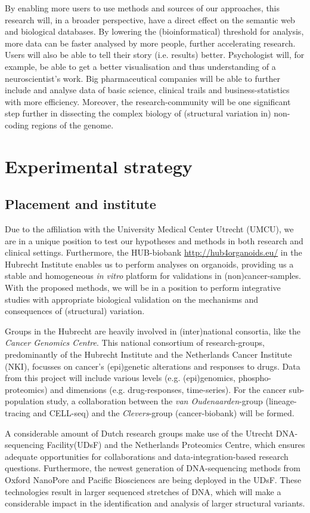 \documentclass[twoside,fontsize=12pt]{article}
\begin{document}
By enabling more users to use methods and sources of our approaches, this research will, in a broader perspective, have a direct effect on the semantic web and biological databases. By lowering the (bioinformatical) threshold for analysis, more data can be faster analysed by more people, further accelerating research. Users will also be able to tell their story (i.e. results) better. Psychologist will, for example, be able to get a better visualisation and thus understanding of a neuroscientist's work. Big pharmaceutical companies will be able to further include and analyse data of basic science, clinical trails and business-statistics with more efficiency. Moreover, the research-community will be one significant step further in dissecting the complex biology of (structural variation in) non-coding regions of the genome.

\section*{Experimental strategy}
\subsection*{Placement and institute}
Due to the affiliation with the University Medical Center Utrecht (UMCU), we are in a unique position to test our hypotheses and methods in both research and clinical settings. Furthermore, the HUB-biobank \url{http://hub4organoids.eu/} in the Hubrecht Institute  enables us to perform analyses on organoids, providing us a stable and homogeneous \textit{in vitro} platform for validations in (non)cancer-samples. With the proposed methods, we will be in a position to perform integrative studies with appropriate biological validation on the mechanisms and consequences of (structural) variation. 

Groups in the Hubrecht are heavily involved in (inter)national consortia, like the \textit{Cancer Genomics Centre}. This national consortium of research-groups, predominantly of the Hubrecht Institute and the Netherlands Cancer Institute (NKI), focusses on cancer's (epi)genetic alterations and responses to drugs. Data from this project will include various levels (e.g. (epi)genomics, phospho-proteomics) and dimensions (e.g. drug-responses, time-series). For the cancer sub-population study, a collaboration between the \textit{van Oudenaarden}-group (lineage-tracing and CELL-seq) and the \textit{Clevers}-group (cancer-biobank) will be formed.

A considerable amount of Dutch research groups make use of the Utrecht DNA-sequencing Facility(UDsF) and the Netherlands Proteomics Centre, which ensures adequate opportunities for collaborations and data-integration-based research questions. Furthermore, the newest generation of DNA-sequencing methods from Oxford NanoPore and Pacific Biosciences are being deployed in the UDsF. These technologies result in larger sequenced stretches of DNA, which will make a considerable impact in the identification and analysis of larger structural variants.
\end{document}
